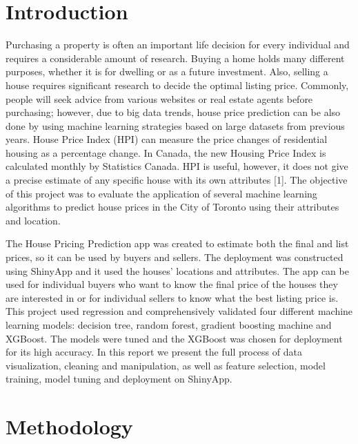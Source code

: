 \documentclass[11pt,]{article}
\begin{document}
\vskip -8.5pt



\noindent  

\hypertarget{introduction}{%
\section{Introduction}\label{introduction}}

Purchasing a property is often an important life decision for every
individual and requires a considerable amount of research. Buying a home
holds many different purposes, whether it is for dwelling or as a future
investment. Also, selling a house requires significant research to
decide the optimal listing price. Commonly, people will seek advice from
various websites or real estate agents before purchasing; however, due
to big data trends, house price prediction can be also done by using
machine learning strategies based on large datasets from previous years.
House Price Index (HPI) can measure the price changes of residential
housing as a percentage change. In Canada, the new Housing Price Index
is calculated monthly by Statistics Canada. HPI is useful, however, it
does not give a precise estimate of any specific house with its own
attributes {[}1{]}. The objective of this project was to evaluate the
application of several machine learning algorithms to predict house
prices in the City of Toronto using their attributes and location.

The House Pricing Prediction app was created to estimate both the final
and list prices, so it can be used by buyers and sellers. The deployment
was constructed using ShinyApp and it used the houses' locations and
attributes. The app can be used for individual buyers who want to know
the final price of the houses they are interested in or for individual
sellers to know what the best listing price is. This project used
regression and comprehensively validated four different machine learning
models: decision tree, random forest, gradient boosting machine and
XGBoost. The models were tuned and the XGBoost was chosen for deployment
for its high accuracy. In this report we present the full process of
data visualization, cleaning and manipulation, as well as feature
selection, model training, model tuning and deployment on ShinyApp.

\hypertarget{methodology}{%
\section{Methodology}\label{methodology}}
\end{document}
